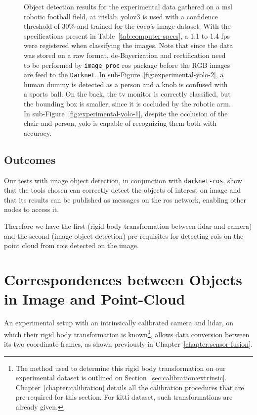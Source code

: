 \begin{figure}[!ht]
\begin{subfigure}[t]{0.45\textwidth}
	\end{subfigure}
	\caption[Image object detection, using \acs{yolo}v3 on our experimental dataset.]{Object detection results for the experimental data gathered on a \ac{msl} robotic football field, at \ac{irislab}. \ac{yolo}v3 is used with a confidence threshold of 30\% and trained for the \ac{coco}'s image dataset. With the specifications present in Table~\ref{tab:computer-specs}, a 1.1 to 1.4 \ac{fps} were registered when classifying the images. Note that since the data was stored on a raw format, de-Bayerization and rectification need to be performed by \texttt{image\_proc} \ac{ros} package before the RGB images are feed to the \texttt{Darknet}. In sub-Figure~\ref{fig:experimental-yolo-2}, a human dummy is detected as a person and a knob is confused with a sports ball. On the back, the tv monitor is correctly classified, but the bounding box is smaller, since it is occluded by the robotic arm. In sub-Figure~\ref{fig:experimental-yolo-1}, despite the occlusion of the chair and person, \ac{yolo} is capable of recognizing them both with accuracy.}
	\label{fig:experimental-object-detection}
\end{figure}

\subsection{Outcomes}
Our tests with image object detection, in conjunction with \texttt{darknet-ros}, show that the tools chosen can correctly detect the objects of interest on image and that its results can be published as messages on the \ac{ros} network, enabling other nodes to access it.

Therefore we have the first (rigid body transformation between \ac{lidar} and camera) and the second (image object detection) pre-requisites for detecting \acp{roi} on the point cloud from \acp{roi} detected on the image.

\section{Correspondences between Objects in Image and Point-Cloud}
\label{sec:object-detection:correspondences-image-point-cloud}
An experimental setup with an intrinsically calibrated camera and \ac{lidar}, on which their rigid body transformation is known\footnote{The method used to determine this rigid body transformation on our experimental dataset is outlined on Section~\ref{sec:calibration:extrinsic}. Chapter~\ref{chapter:calibration} details all the calibration procedures that are pre-required for this section. For \ac{kitti} dataset, such transformations are already given.}, allows data conversion between its two coordinate frames, as shown previously in Chapter~\ref{chapter:sensor-fusion}. 

